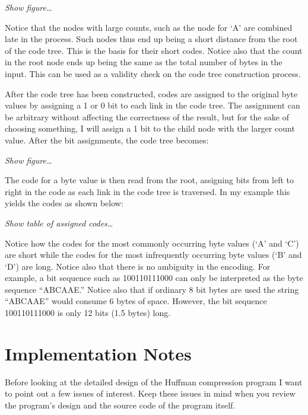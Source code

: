 \textit{Show figure\ldots}

Notice that the nodes with large counts, such as the node for `A' are combined late in the
process. Such nodes thus end up being a short distance from the root of the code tree. This is
the basis for their short codes. Notice also that the count in the root node ends up being the
same as the total number of bytes in the input. This can be used as a validity check on the code
tree construction process.

After the code tree has been constructed, codes are assigned to the original byte values by
assigning a 1 or 0 bit to each link in the code tree. The assignment can be arbitrary without
affecting the correctness of the result, but for the sake of choosing something, I will assign a
1 bit to the child node with the larger count value.  After the bit assignments, the code tree
becomes:

\textit{Show figure\ldots}

The code for a byte value is then read from the root, assigning bits from left to right in the
code as each link in the code tree is traversed. In my example this yields the codes as shown
below:

\textit{Show table of assigned codes\ldots}

Notice how the codes for the most commonly occurring byte values (`A' and `C') are short while
the codes for the most infrequently occurring byte values (`B' and `D') are long. Notice also
that there is no ambiguity in the encoding. For example, a bit sequence such as 100110111000 can
only be interpreted as the byte sequence ``ABCAAE.'' Notice also that if ordinary 8 bit bytes
are used the string ``ABCAAE'' would consume 6 bytes of space. However, the bit sequence
100110111000 is only 12 bits (1.5 bytes) long.

\section{Implementation Notes}

Before looking at the detailed design of the Huffman compression program I want to point out a
few issues of interest. Keep these issues in mind when you review the program's design and the
source code of the program itself.

